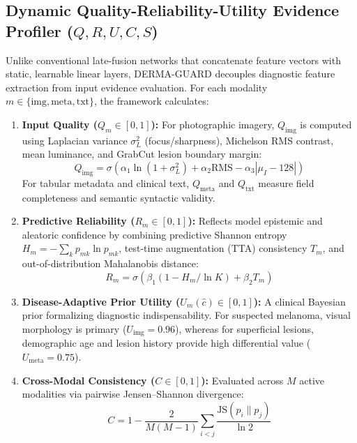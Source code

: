 \documentclass[conference]{IEEEtran}
\begin{document}
\subsection{Dynamic Quality-Reliability-Utility Evidence Profiler ($Q, R, U, C, S$)}
Unlike conventional late-fusion networks that concatenate feature vectors with static, learnable linear layers, DERMA-GUARD decouples diagnostic feature extraction from input evidence evaluation. For each modality $m \in \{\text{img}, \text{meta}, \text{txt}\}$, the framework calculates:
\begin{enumerate}
    \item \textbf{Input Quality ($Q_m \in [0, 1]$):} For photographic imagery, $Q_{\text{img}}$ is computed using Laplacian variance $\sigma_L^2$ (focus/sharpness), Michelson RMS contrast, mean luminance, and GrabCut lesion boundary margin:
    \begin{equation}
    Q_{\text{img}} = \sigma\left( \alpha_1 \ln(1 + \sigma_L^2) + \alpha_2 \text{RMS} - \alpha_3 |\mu_I - 128| \right)
    \end{equation}
    For tabular metadata and clinical text, $Q_{\text{meta}}$ and $Q_{\text{txt}}$ measure field completeness and semantic syntactic validity.
    \item \textbf{Predictive Reliability ($R_m \in [0, 1]$):} Reflects model epistemic and aleatoric confidence by combining predictive Shannon entropy $H_m = -\sum_{k} p_{mk} \ln p_{mk}$, test-time augmentation (TTA) consistency $T_m$, and out-of-distribution Mahalanobis distance:
    \begin{equation}
    R_m = \sigma\left( \beta_1 (1 - H_m / \ln K) + \beta_2 T_m \right)
    \end{equation}
    \item \textbf{Disease-Adaptive Prior Utility ($U_m(\hat{c}) \in [0, 1]$):} A clinical Bayesian prior formalizing diagnostic indispensability. For suspected melanoma, visual morphology is primary ($U_{\text{img}}=0.96$), whereas for superficial lesions, demographic age and lesion history provide high differential value ($U_{\text{meta}}=0.75$).
    \item \textbf{Cross-Modal Consistency ($C \in [0, 1]$):} Evaluated across $M$ active modalities via pairwise Jensen--Shannon divergence:
    \begin{equation}
    C = 1 - \frac{2}{M(M-1)} \sum_{i < j} \frac{\text{JS}(p_i \parallel p_j)}{\ln 2}
    \end{equation}
\end{enumerate}
\end{document}
